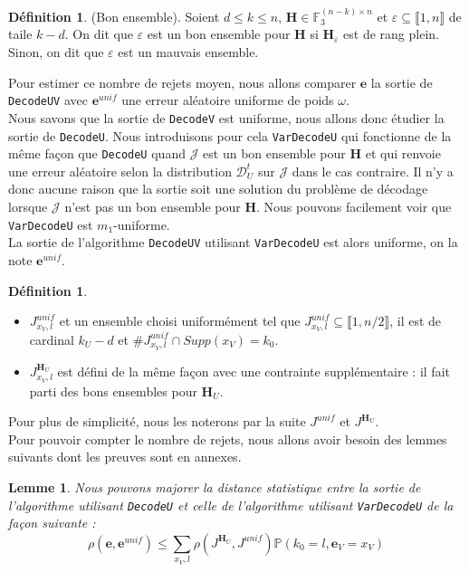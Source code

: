 \documentclass[12pt]{article}
\theoremstyle{plain}
\newtheorem{lemme}[thm]{Lemme}
\theoremstyle{definition}
\newtheorem{defi}[thm]{Définition}
\newcommand{\F}{\mathbb{F}}
\newcommand{\e}{\mathbf{e}}
\newcommand{\J}{\mathcal{J}}
\newcommand{\D}{\mathcal{D}}
\begin{document}
\begin{defi} (Bon ensemble).
Soient $d \leq k \leq n$, $\mathbf{H}\in\F_3^{(n-k)\times n}$ et $\varepsilon \subseteq \llbracket1,n\rrbracket$ de taile $k-d$. On dit que $\varepsilon$ est un bon ensemble pour $\mathbf{H}$ si $\mathbf{H}_{\overline{\varepsilon}}$ est de rang plein. Sinon, on dit que $\varepsilon$ est un mauvais ensemble.
\end{defi}


\noindent Pour estimer ce nombre de rejets moyen, nous allons comparer $\e$ la sortie de \verb|DecodeUV| avec $\e^{unif}$ une erreur aléatoire uniforme de poids $\omega$.\\
Nous savons que la sortie de \verb|DecodeV| est uniforme, nous allons donc étudier la sortie de \verb|DecodeU|.
Nous introduisons pour cela \verb|VarDecodeU| qui fonctionne de la même façon que \verb|DecodeU| quand $\J$ est un bon ensemble pour $\mathbf{H}$ et qui renvoie une erreur aléatoire selon la distribution $\D_U^t$ sur $\J$ dans le cas contraire.
Il n'y a donc aucune raison que la sortie soit une solution du problème de décodage lorsque $\J$ n'est pas un bon ensemble pour $\mathbf{H}$.
Nous pouvons facilement voir que \verb|VarDecodeU| est $m_1$-uniforme.\\
La sortie de l'algorithme \verb|DecodeUV| utilisant \verb|VarDecodeU| est alors uniforme, on la note $\e^{unif}$.\\

\begin{defi}\
\begin{itemize}
\item $J_{x_V,l}^{unif}$ et un ensemble choisi uniformément tel que $J_{x_V,l}^{unif}\subseteq \llbracket 1,n/2 \rrbracket$, il est de cardinal $k_U-d$ et $\#J_{x_V,l}^{unif}\cap Supp(x_V) = k_0$. 
\item $J_{x_V, l}^{\mathbf{H}_U}$ est défini de la même façon avec une contrainte supplémentaire : il fait parti des bons ensembles pour $\mathbf{H}_U$.
\end{itemize}
\end{defi}

\noindent Pour plus de simplicité, nous les noterons par la suite $J^{unif}$ et $J^{\mathbf{H}_U}$.\\

\noindent Pour pouvoir compter le nombre de rejets, nous allons avoir besoin des lemmes suivants dont les preuves sont en annexes.

\begin{lemme}\label{maj_dist_e_eunif}
Nous pouvons majorer la distance statistique entre la sortie de l'algorithme utilisant \verb|DecodeU| et celle de l'algorithme utilisant \verb|VarDecodeU| de la façon suivante :
$$ \rho\left(\e ,\e^{unif}\right) \leq \sum\limits_{x_V,l} \rho\left(J^{\mathbf{H}_U},J^{unif}\right)\mathbb{P}\left(k_0 = l, \e_V = x_V\right) $$ 
\end{lemme}
\end{document}
